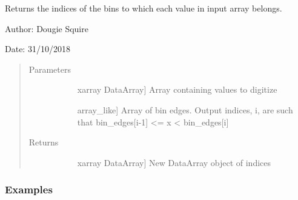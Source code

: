 \documentclass[letterpaper,10pt,english]{sphinxmanual}
\begin{document}
\begin{fulllineitems}
\label{\detokenize{utils_doc:utils.digitize}}
Returns the indices of the bins to which each value in input array belongs.

\begin{DUlineblock}{0em}
\item[] Author: Dougie Squire
\item[] Date: 31/10/2018
\end{DUlineblock}
\begin{quote}\begin{description}
\item[{Parameters}] \leavevmode\begin{description}
\item[{}] \leavevmode{[}xarray DataArray{]}
Array containing values to digitize

\item[{}] \leavevmode{[}array\_like{]}
Array of bin edges. Output indices, i, are such that bin\_edges{[}i-1{]} \textless{}= x \textless{} bin\_edges{[}i{]}

\end{description}

\item[{Returns}] \leavevmode\begin{description}
\item[{}] \leavevmode{[}xarray DataArray{]}
New DataArray object of indices

\end{description}

\end{description}\end{quote}
\subsubsection*{Examples}


\end{fulllineitems}
\end{document}
